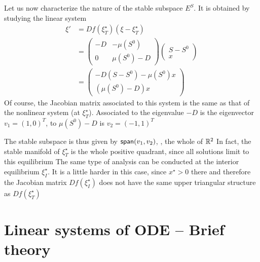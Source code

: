 \documentclass[aspectratio=169]{beamer}
\begin{document}
\begin{frame}
Let us now characterize the
nature of the stable subspace $E^S$. It is obtained by studying the
linear system
\begin{align}
\xi' &= Df(\xi_T^\star)(\xi-\xi_T^\star) \nonumber \\
&= \left(
\begin{matrix}
-D & -\mu(S^0) \\
0 & \mu(S^0)-D
\end{matrix}
\right)
\left(
\begin{matrix}
S-S^0 \\
x
\end{matrix}
\right) \nonumber \\
&= \left(
\begin{matrix}
-D(S-S^0)-\mu(S^0)x \\
(\mu(S^0)-D)x
\end{matrix}
\right)
\end{align}
Of course, the Jacobian matrix associated to this system is the same
as that of the nonlinear system (at $\xi_T^\star$). Associated to the
eigenvalue $-D$ is the eigenvector $v_1=(1,0)^T$, to $\mu(S^0)-D$ is
$v_2=(-1,1)^T$
\end{frame}

\begin{frame} 
The stable subspace is thus given by $\mathsf{span}(v_1,v_2)$, \ie,
the whole of $\mathbb{R}^2$
\vfill
In fact, the stable manifold of $\xi_T^\star$ is the whole positive
quadrant, since all solutions limit to this equilibrium 
\vfill
The same type of analysis can be conducted at the interior equilibrium $\xi_I^\star$. It is a little harder in this case, since $x^\star>0$ there and therefore the Jacobian matrix $Df(\xi_I^\star)$ does not have the same upper triangular structure as $Df(\xi_T^\star)$
\end{frame}

\section{Linear systems of ODE -- Brief theory}


\end{document}
